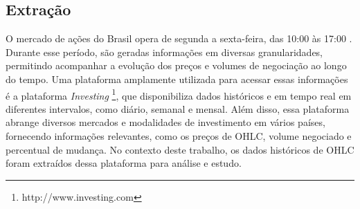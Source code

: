 \subsection{Extração}
\label{subsec:extracao}
O mercado de ações do Brasil opera de segunda a sexta-feira, das 10:00 às 17:00 \cite{B3H:2023}. Durante esse período, são geradas informações em diversas granularidades, permitindo acompanhar a evolução dos preços e volumes de negociação ao longo do tempo. Uma plataforma amplamente utilizada para acessar essas informações é a plataforma \textit{Investing} \footnote{http://www.investing.com}, que disponibiliza dados históricos e em tempo real em diferentes intervalos, como diário, semanal e mensal. Além disso, essa plataforma abrange diversos mercados e modalidades de investimento em vários países, fornecendo informações relevantes, como os preços de \ac{OHLC}, volume negociado e percentual de mudança. No contexto deste trabalho, os dados históricos de \ac{OHLC} foram extraídos dessa plataforma para análise e estudo.

